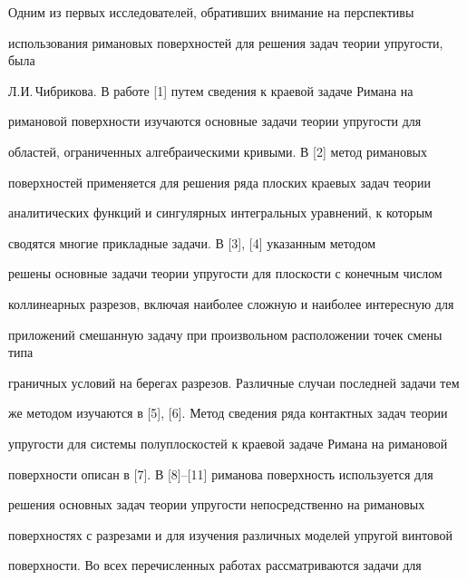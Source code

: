  




\maketitle 


\label{begin} 


 


 


 


Одним из первых исследователей, обративших внимание на перспективы 


использования римановых поверхностей для решения задач теории упругости, была 


Л.И.\,Чибрикова. В работе [1] путем сведения к краевой задаче Римана на 


римановой поверхности изучаются основные задачи теории упругости для 


областей, ограниченных алгебраическими кривыми. В [2] метод римановых 


поверхностей применяется для решения ряда плоских краевых задач теории 


аналитических функций и сингулярных интегральных уравнений, к которым 


сводятся многие прикладные задачи. В [3], [4] указанным методом 


решены основные задачи теории упругости для плоскости с конечным числом 


коллинеарных разрезов, включая наиболее сложную и наиболее интересную для 


приложений смешанную задачу при произвольном расположении точек смены типа 


граничных условий на берегах разрезов. Различные случаи последней задачи тем 


же методом изучаются в [5], [6]. Метод сведения ряда контактных задач теории 


упругости для системы полуплоскостей к краевой задаче Римана на римановой 


поверхности описан в [7]. В [8]--[11] риманова поверхность используется для 


решения основных задач теории упругости непосредственно на римановых 


поверхностях с разрезами и для изучения различных моделей упругой винтовой 


поверхности. Во всех перечисленных работах рассматриваются задачи для 



